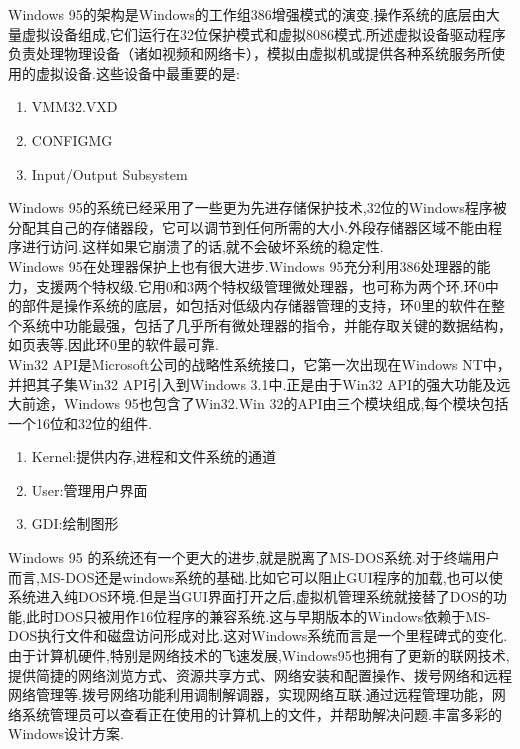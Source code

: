 \documentclass[a4paper,12pt,notitlepage]{article}
\begin{document}
	Windows 95的架构是Windows的工作组386增强模式的演变.操作系统的底层由大量虚拟设备组成,它们运行在32位保护模式和虚拟8086模式.所述虚拟设备驱动程序负责处理物理设备（诸如视频和网络卡），模拟由虚拟机或提供各种系统服务所使用的虚拟设备.这些设备中最重要的是: 
	
\begin{enumerate}
	\item VMM32.VXD
	\item CONFIGMG
	\item Input/Output Subsystem
\end{enumerate}

	Windows 95的系统已经采用了一些更为先进存储保护技术,32位的Windows程序被分配其自己的存储器段，它可以调节到任何所需的大小.外段存储器区域不能由程序进行访问.这样如果它崩溃了的话,就不会破坏系统的稳定性. \\

	Windows 95在处理器保护上也有很大进步.Windows 95充分利用386处理器的能力，支援两个特权级.它用0和3两个特权级管理微处理器，也可称为两个环.环0中的部件是操作系统的底层，如包括对低级内存储器管理的支持，环0里的软件在整个系统中功能最强，包括了几乎所有微处理器的指令，并能存取关键的数据结构，如页表等.因此环0里的软件最可靠. \\

	Win32 API是Microsoft公司的战略性系统接口，它第一次出现在Windows NT中，并把其子集Win32 API引入到Windows 3.1中.正是由于Win32 API的强大功能及远大前途，Windows 95也包含了Win32.Win 32的API由三个模块组成,每个模块包括一个16位和32位的组件. \\
	
\begin{enumerate}
	\item Kernel:提供内存,进程和文件系统的通道
	\item User:管理用户界面
	\item GDI:绘制图形
\end{enumerate}

	Windows 95 的系统还有一个更大的进步,就是脱离了MS-DOS系统.对于终端用户而言,MS-DOS还是windows系统的基础.比如它可以阻止GUI程序的加载,也可以使系统进入纯DOS环境.但是当GUI界面打开之后,虚拟机管理系统就接替了DOS的功能,此时DOS只被用作16位程序的兼容系统.这与早期版本的Windows依赖于MS-DOS执行文件和磁盘访问形成对比.这对Windows系统而言是一个里程碑式的变化. \\
	
	由于计算机硬件,特别是网络技术的飞速发展,Windows95也拥有了更新的联网技术,提供简捷的网络浏览方式、资源共享方式、网络安装和配置操作、拨号网络和远程网络管理等.拨号网络功能利用调制解调器，实现网络互联.通过远程管理功能，网络系统管理员可以查看正在使用的计算机上的文件，并帮助解决问题.丰富多彩的Windows设计方案. \\
\end{document}

